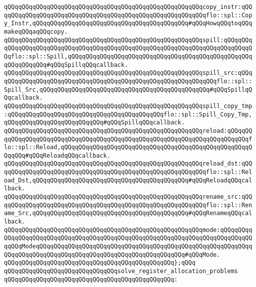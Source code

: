 \verb|qQQqqQQqqQQqqQQqqQQqqQQqqQQqqQQqqQQqqQQqqQQqqQQqqQQqqQQqcopy_instr:qQQqqQQqqQQqqQQqqQQqqQQqqQQqqQQqqQQqqQQqqQQqqQQqqQQqqQQqqQQqflo::spl::Copy_Instr,qQQqqQQqqQQqqQQqqQQqqQQqqQQqqQQqqQQqqQQqqQQq#qQQqHowqQQqtoqQQqmakeqQQqaqQQqcopy.|\newline
\verb|qQQqqQQqqQQqqQQqqQQqqQQqqQQqqQQqqQQqqQQqqQQqqQQqqQQqqQQqspill:qQQqqQQqqQQqqQQqqQQqqQQqqQQqqQQqqQQqqQQqqQQqqQQqqQQqqQQqqQQqqQQqqQQqqQQqqQQqqQQqflo::spl::Spill,qQQqqQQqqQQqqQQqqQQqqQQqqQQqqQQqqQQqqQQqqQQqqQQqqQQqqQQqqQQqqQQq#qQQqSpillqQQqcallback.|\newline
\verb|qQQqqQQqqQQqqQQqqQQqqQQqqQQqqQQqqQQqqQQqqQQqqQQqqQQqqQQqspill_src:qQQqqQQqqQQqqQQqqQQqqQQqqQQqqQQqqQQqqQQqqQQqqQQqqQQqqQQqqQQqqQQqflo::spl::Spill_Src,qQQqqQQqqQQqqQQqqQQqqQQqqQQqqQQqqQQqqQQqqQQqqQQq#qQQqSpillqQQqcallback.|\newline
\verb|qQQqqQQqqQQqqQQqqQQqqQQqqQQqqQQqqQQqqQQqqQQqqQQqqQQqqQQqspill_copy_tmp:qQQqqQQqqQQqqQQqqQQqqQQqqQQqqQQqqQQqqQQqqQQqflo::spl::Spill_Copy_Tmp,qQQqqQQqqQQqqQQqqQQqqQQqqQQq#qQQqSpillqQQqcallback.|\newline
\verb|qQQqqQQqqQQqqQQqqQQqqQQqqQQqqQQqqQQqqQQqqQQqqQQqqQQqqQQqreload:qQQqqQQqqQQqqQQqqQQqqQQqqQQqqQQqqQQqqQQqqQQqqQQqqQQqqQQqqQQqqQQqqQQqqQQqqQQqflo::spl::Reload,qQQqqQQqqQQqqQQqqQQqqQQqqQQqqQQqqQQqqQQqqQQqqQQqqQQqqQQqqQQq#qQQqReloadqQQqcallback.|\newline
\verb|qQQqqQQqqQQqqQQqqQQqqQQqqQQqqQQqqQQqqQQqqQQqqQQqqQQqqQQqreload_dst:qQQqqQQqqQQqqQQqqQQqqQQqqQQqqQQqqQQqqQQqqQQqqQQqqQQqqQQqqQQqflo::spl::Reload_Dst,qQQqqQQqqQQqqQQqqQQqqQQqqQQqqQQqqQQqqQQqqQQq#qQQqReloadqQQqcallback.|\newline
\verb|qQQqqQQqqQQqqQQqqQQqqQQqqQQqqQQqqQQqqQQqqQQqqQQqqQQqqQQqrename_src:qQQqqQQqqQQqqQQqqQQqqQQqqQQqqQQqqQQqqQQqqQQqqQQqqQQqqQQqqQQqflo::spl::Rename_Src,qQQqqQQqqQQqqQQqqQQqqQQqqQQqqQQqqQQqqQQqqQQq#qQQqRenameqQQqcallback.|\newline
\verb|qQQqqQQqqQQqqQQqqQQqqQQqqQQqqQQqqQQqqQQqqQQqqQQqqQQqqQQqmode:qQQqqQQqqQQqqQQqqQQqqQQqqQQqqQQqqQQqqQQqqQQqqQQqqQQqqQQqqQQqqQQqqQQqqQQqqQQqqQQqqQQqModeqQQqqQQqqQQqqQQqqQQqqQQqqQQqqQQqqQQqqQQqqQQqqQQqqQQqqQQqqQQqqQQqqQQqqQQqqQQqqQQqqQQqqQQqqQQqqQQqqQQqqQQqqQQqqQQq#qQQqMode.|\newline
\verb|qQQqqQQqqQQqqQQqqQQqqQQqqQQqqQQqqQQqqQQqqQQqqQQq};qQQq|\newline
\newline
\verb|qQQqqQQqqQQqqQQqqQQqqQQqqQQqqQQqsolve_register_allocation_problems|\newline
\verb|qQQqqQQqqQQqqQQqqQQqqQQqqQQqqQQqqQQqqQQqqQQqqQQq:|\newline
